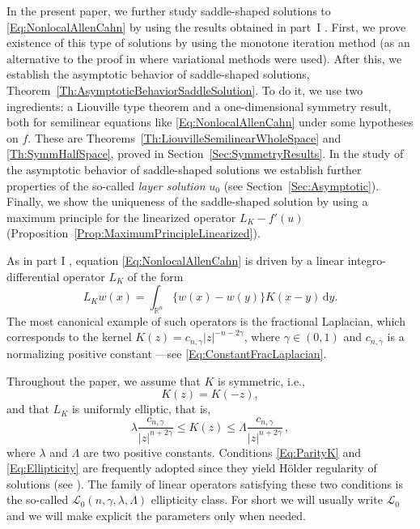\documentclass[12pt,reqno]{amsart}
\theoremstyle{definition}
\theoremstyle{remark}
\newcommand{\con}[1]{\mathbb{#1}}
\newcommand{\R}{\con{R}} %
\newcommand{\lcal}{\mathcal{L}}
\newcommand{\s}{\gamma}
\renewcommand{\d}{\,\mathrm{d}} %
\numberwithin{equation}{section}
\begin{document}
In the present paper, we further study saddle-shaped solutions to \eqref{Eq:NonlocalAllenCahn} by using the results obtained in part~I \cite{FelipeSanz-Perela:IntegroDifferentialI}. First, we prove existence of this type of solutions by using the monotone iteration method (as an alternative to the proof in \cite{FelipeSanz-Perela:IntegroDifferentialI} where variational methods were used). After this, we establish the asymptotic behavior of saddle-shaped solutions,  Theorem~\ref{Th:AsymptoticBehaviorSaddleSolution}. To do it, we use two ingredients: a Liouville type theorem and a one-dimensional symmetry result, both for semilinear equations like \eqref{Eq:NonlocalAllenCahn} under some hypotheses on $f$. These are Theorems~\ref{Th:LiouvilleSemilinearWholeSpace} and \ref{Th:SymmHalfSpace}, proved in Section~\ref{Sec:SymmetryResults}. In the study of the asymptotic behavior of saddle-shaped solutions we establish further properties of the so-called \emph{layer solution} $u_0$ (see Section~\ref{Sec:Asymptotic}). Finally, we show the uniqueness of the saddle-shaped solution by using a maximum principle for the linearized operator $L_K - f'(u)$ (Proposition~\ref{Prop:MaximumPrincipleLinearized}).

As in part I \cite{FelipeSanz-Perela:IntegroDifferentialI}, equation \eqref{Eq:NonlocalAllenCahn} is driven by a linear integro-differential operator $L_K$ of the form
\begin{equation}
\label{Eq:DefOfLu}
L_K w(x) = \int_{\R^n} \{w(x) - w(y)\} K(x-y)\d y.
\end{equation}
The most canonical example of such operators is the fractional Laplacian, which corresponds to the kernel $K(z) = c_{n, \s} |z|^{-n-2\s}$, where $\s \in (0,1)$ and $c_{n, \s}$ is a normalizing positive constant ---see \eqref{Eq:ConstantFracLaplacian}.

Throughout the paper, we assume that $K$ is symmetric, i.e.,
\begin{equation}
\label{Eq:ParityK}
K(z) = K(-z),
\end{equation}
and that $L_K$ is uniformly elliptic, that is,
\begin{equation}
\label{Eq:Ellipticity}
\lambda \dfrac{c_{n,\s}}{|z|^{n+2\s}} \leq K(z) \leq \Lambda \dfrac{c_{n,\s}}{|z|^{n+2\s}}\,, 
\end{equation}
where $\lambda$ and $\Lambda$ are two positive constants. Conditions \eqref{Eq:ParityK} and \eqref{Eq:Ellipticity} are frequently adopted since they yield Hölder regularity of solutions (see \cite{RosOton-Survey,SerraC2s+alphaRegularity}). The family of linear operators satisfying these two conditions is the so-called $\lcal_0(n,\s,\lambda, \Lambda)$ ellipticity class. For short we will usually write $\lcal_0$ and we will make explicit the parameters only when needed. 
\end{document}
